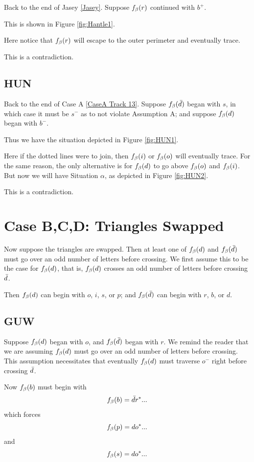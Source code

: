 \label{Hantle}
Back to the end of Jasey \ref{Jasey}. Suppose $f_\beta(r)$ continued with $b^+$. 

This is shown in Figure \ref{fig:Hantle1}.

Here notice that $f_\beta(r)$ will escape to the outer perimeter and eventually trace.

This is a contradiction.

\subsection{HUN}\label{HUN}
Back to the end of Case A \ref{CaseA Track 13}. Suppose $f_\beta(\bar{d})$ began with $s$, in which case it must be $s^-$ as to not violate Assumption A; and suppose $f_\beta(d)$ began with $b^-$.

Thus we have the situation depicted in Figure \ref{fig:HUN1}.

Here if the dotted lines were to join, then $f_\beta(i)$ or $f_\beta(o)$ will eventually trace. For the same reason, the only alternative is for $f_\beta(d)$ to go above $f_\beta(o)$ and $f_\beta(i)$. But now we will have Situation $\alpha$, as depicted in Figure \ref{fig:HUN2}.

This is a contradiction.

\section{Case B,C,D: Triangles Swapped}\label{CaseBCD Track 13}

Now suppose the triangles are swapped. Then at least one of $f_\beta(d)$ and $f_\beta(\bar{d})$ must go over an odd number of letters before crossing. We first assume this to be the case for $f_\beta(d)$, that is, $f_\beta(d)$ crosses an odd number of letters before crossing $\bar{d}$.

Then $f_\beta(d)$ can begin with $o$, $i$, $s$, or $p$; and $f_\beta(\bar{d})$ can begin with $r$, $b$, or $d$.

\subsection{GUW}\label{GUW}
Suppose $f_\beta(d)$ began with $o$, and $f_\beta(\bar{d})$ began with $r$. We remind the reader that we are assuming $f_\beta(d)$ must go over an odd number of letters before crossing. This assumption necessitates that eventually $f_\beta(d)$ must traverse $o^-$ right before crossing $\bar{d}$.

Now $f_\beta(b)$ must begin with
\[
f_\beta(b) = \bar{d} r^*...
\]
which forces
\[
f_\beta(p) = d o^*...
\]
and
\[
f_\beta(s) = d o^*...
\]

